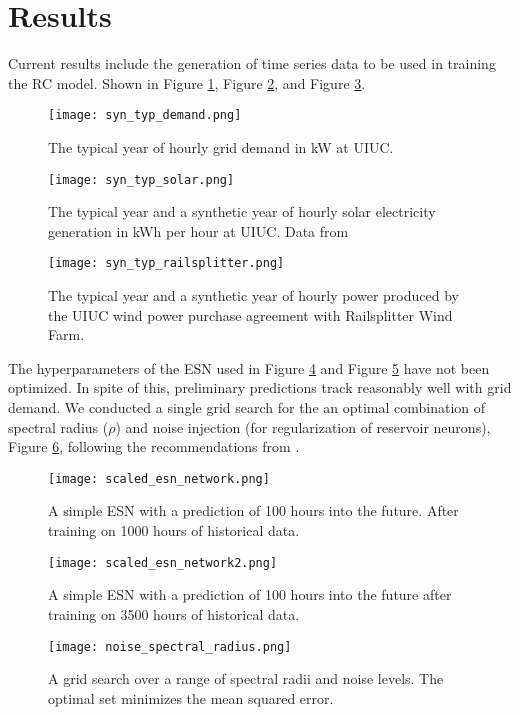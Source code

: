 \section{Results}

Current results include the generation of time series data to be used in
training the RC model. Shown in Figure \ref{fig:demand}, Figure \ref{fig:solar}, and Figure \ref{fig:wind}.

\begin{figure}[h]
 	\centering
 	\texttt{[image: syn\_typ\_demand.png]}
 	\caption{The typical year of hourly grid demand in kW at UIUC.}
  \label{fig:demand}
\end{figure}
\begin{figure}[h]
	\centering
	\texttt{[image: syn\_typ\_solar.png]}
	\caption{The typical year and a synthetic year of hourly solar electricity
  \label{fig:solar}
  generation in kWh per hour at UIUC. Data from
  \cite{alsoenergy_university_2019}}
\end{figure}
\begin{figure}[h]
	\centering
	\texttt{[image: syn\_typ\_railsplitter.png]}
	\caption{The typical year and a synthetic year of hourly power produced by
  \label{fig:wind}
  the UIUC wind power purchase agreement with Railsplitter Wind Farm.}
\end{figure}

The hyperparameters of the \acrshort{ESN} used in Figure \ref{fig:ESN1} and
Figure \ref{fig:ESN2} have not been optimized. In spite of this, preliminary
predictions track reasonably well with grid demand. We conducted a single grid
search for the an optimal combination of spectral radius ($\rho$) and noise
injection (for regularization of reservoir neurons), Figure
\ref{fig:gridsearch}, following the recommendations from
\cite{lukosevicius_practical_2012}.

\begin{figure}[h]
  \centering
  \texttt{[image: scaled\_esn\_network.png]}
  \caption{A simple ESN with a prediction of 100 hours into the future. After
  training on 1000 hours of historical data.}
  \label{fig:ESN1}
\end{figure}
\begin{figure}[h]
  \centering
  \texttt{[image: scaled\_esn\_network2.png]}
  \caption{A simple ESN with a prediction of 100 hours into the future after
  training on 3500 hours of historical data.}
  \label{fig:ESN2}
\end{figure}
\begin{figure}[h]
  \centering
  \texttt{[image: noise\_spectral\_radius.png]}
  \caption{A grid search over a range of spectral radii and noise levels. The
  optimal set minimizes the mean squared error.}
  \label{fig:gridsearch}
\end{figure}
